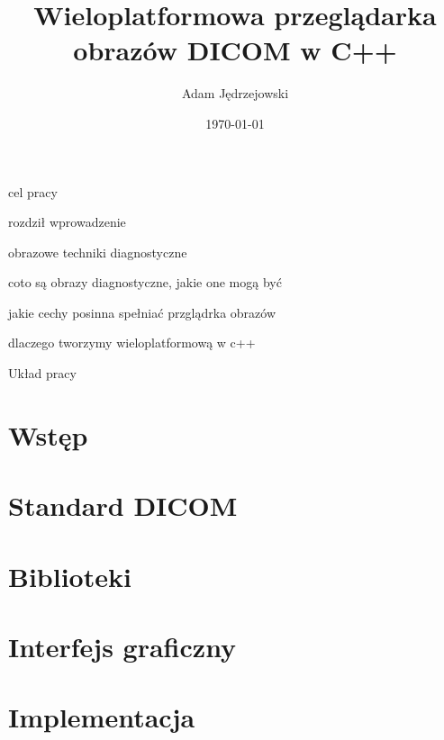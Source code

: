 \documentclass{article}
\author{Adam Jędrzejowski}
\title{Wieloplatformowa przeglądarka obrazów DICOM w C++}
\date{\today}
\begin{document}
\maketitle

cel pracy

rozdził wprowadzenie

obrazowe techniki diagnostyczne

coto są obrazy diagnostyczne, jakie one mogą być

jakie cechy posinna spełniać przglądrka obrazów

dlaczego tworzymy wieloplatformową w c++

Układ pracy

\part{Wstęp}



\part{Standard DICOM}

\part{Biblioteki}

\part{Interfejs graficzny}

\part{Implementacja}

\end{document}
